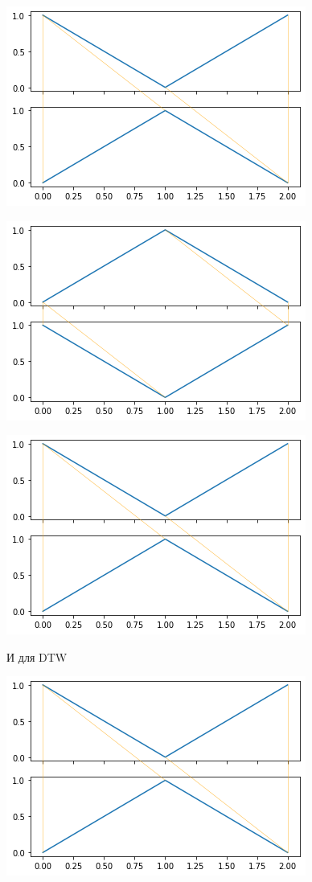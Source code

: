 \documentclass[12pt, twoside]{article}
\begin{document}
\includegraphics{sample11}

\includegraphics{sample12}

\includegraphics{sample13}

И для DTW

\includegraphics{sample21}
\end{document}
